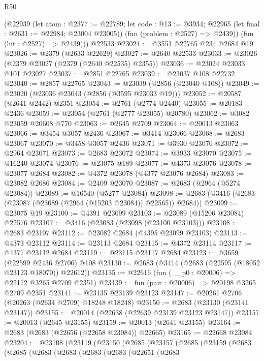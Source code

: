 \begin{lexlean}{R50}
\begin{coremodule}
        (@22939
          (let atom : @2377 := @22789;
          let code : @13 := @3934; @22965 (let final : @2631 := @22984; @23004 @23005))
          (fun (problem : @2527) => @2439))
        (fun (hit : @2527) => @2439)))
    @22533
@23024 := @3551 @22765 @234 @2684 @19
@23026 := @2379 (@2633 @22629)
@23027 := @2640 @22533
@23033 := @23026 (@2379 @23027 (@2379 (@2640 @22535) @2355))
@23036 := @23024 @23033 @101 @23027
@23037 := @2851 @22765
@23039 := @23037 @108 @22732
@23040 := @2857 @22765
@23043 := @23039 (@2856 (@23040 @108))
@23049 := @23020 (@23036 @23043 (@2856 (@3595 @23033 @19)))
@23052 := @20587 (@2641 @2442) @2351
@23054 := @2761 (@2774 @2440)
@23055 := @20183 @2436
@23059 := @23054 (@2761 (@2777 @23055) @20780)
@23062 := @3082 @23059 @20608 @770
@23063 := @2645 @2709
@23064 := @20013 @23063
@23066 := @3454 @3057 @2436
@23067 := @3414 @23066
@23068 := @2683 @23067
@23070 := @3458 @3057 @2436
@23071 := @3930 @23070
@23072 := @2964 @23071
@23073 := @2683 @23072
@23074 := @3933 @23070
@23075 := @16240 @23074
@23076 := @23075 @189
@23077 := @4373 @23076
@23078 := @23077 @2684
@23082 := @4372 @23078 (@4377 @23076 @2684)
@23083 := @23082 @2686
@23084 := @2409 @23070
@23087 := @2683 (@2964 (@5274 @23084))
@23089 := @16540 (@5277 @23084)
@23098 := @2683 (@3416 (@2683 (@23087 (@23089 (@2964 (@15203 @23084)) @22565)) @2684))
@23099 := @23075 @19
@23100 := @4391 @23099
@23103 := @23089 (@15206 @23084) @22576
@23107 := @3416 (@23083 (@23098 (@23100 @23103)))
@23108 := @2683 @23107
@23112 := @23082 @2684 (@4395 @23099 @23103)
@23113 := @4373 @23112
@23114 := @23113 @2684
@23115 := @4372 @23114
@23117 := @4377 @23112 @2684
@23119 := @23115 @23117 @2684
@23123 := @3659 (@22599 @2436 @2706) @108
@23130 := @2683 (@3414 (@2683 (@22595 (@18052 @23123 @18070)) @22612))
@23135 := @22616 (fun (__p0 : @20006) => @22172 @3265 @2709 @2351)
@23139 := fun (pair : @20006) => @20198 @3265 @2709 @2351
@23141 := @23135 @23139 @23123
@23147 := @20261 @2706 (@20263 (@2634 @2709) @18248 @18248)
@23150 := @2683 (@23130 (@23141 @23147))
@23155 := @20014 (@22638 (@22639 @23139 @23123 @23147))
@23157 := @20013 (@2645 @23155)
@23159 := @20013 (@2641 @23155)
@23164 := @2683 (@2683 (@22656 (@22658 @23084)) @22665)
@23165 := @22668 @23084
@23204 := @23108
    (@23119
      (@23150
        (@2685
          (@23157
            (@2685
              (@23159
                (@2683
                  (@2685
                    (@2683
                      (@2683
                        (@2683
                          (@2683
                            (@22651
                              (@2683

\end{coremodule}
\end{lexlean}

